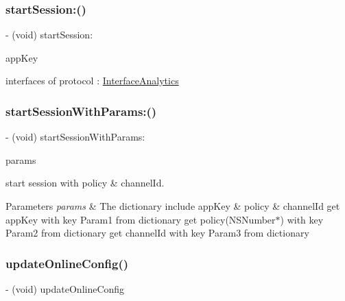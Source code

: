 \subsubsection{\texorpdfstring{start\+Session\+:()}{startSession:()}}
{\footnotesize\ttfamily -\/ (void) start\+Session\+: \begin{DoxyParamCaption}\item[{(N\+S\+String$\ast$)}]{app\+Key }\end{DoxyParamCaption}}

interfaces of protocol \+: \hyperlink{classInterfaceAnalytics-p}{Interface\+Analytics} \mbox{\label{interfaceAnalyticsUmeng_a6276970a7dc255909fa8271f48f10f66}} 
\subsubsection{\texorpdfstring{start\+Session\+With\+Params\+:()}{startSessionWithParams:()}}
{\footnotesize\ttfamily -\/ (void) start\+Session\+With\+Params\+: \begin{DoxyParamCaption}\item[{(N\+S\+Mutable\+Dictionary$\ast$)}]{params }\end{DoxyParamCaption}}



start session with policy \& channel\+Id. 


\begin{DoxyParams}{Parameters}
{\em params} & The dictionary include app\+Key \& policy \& channel\+Id get app\+Key with key \textquotesingle{}Param1\textquotesingle{} from dictionary get policy(\+N\+S\+Number$\ast$) with key \textquotesingle{}Param2\textquotesingle{} from dictionary get channel\+Id with key \textquotesingle{}Param3\textquotesingle{} from dictionary \\
\hline
\end{DoxyParams}
\mbox{\label{interfaceAnalyticsUmeng_a7d2aef9bd4a68f9e08333f047e98b9fd}} 
\subsubsection{\texorpdfstring{update\+Online\+Config()}{updateOnlineConfig()}}
{\footnotesize\ttfamily -\/ (void) update\+Online\+Config \begin{DoxyParamCaption}{ }\end{DoxyParamCaption}}

